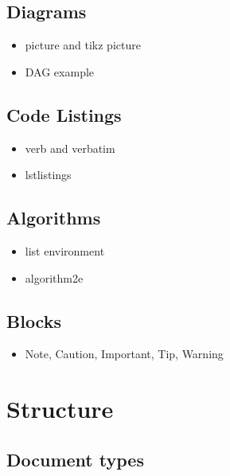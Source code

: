 \documentclass[
]{book}
\providecommand{\tightlist}{%
  \setlength{\itemsep}{0pt}\setlength{\parskip}{0pt}}
\begin{document}
\hypertarget{diagrams}{%
\section{Diagrams}\label{diagrams}}

\begin{itemize}
\tightlist
\item
  picture and tikz picture
\item
  DAG example
\end{itemize}

\hypertarget{code-listings}{%
\section{Code Listings}\label{code-listings}}

\begin{itemize}
\tightlist
\item
  verb and verbatim
\item
  lstlistings
\end{itemize}

\hypertarget{algorithms}{%
\section{Algorithms}\label{algorithms}}

\begin{itemize}
\tightlist
\item
  list environment
\item
  algorithm2e
\end{itemize}

\hypertarget{blocks}{%
\section{Blocks}\label{blocks}}

\begin{itemize}
\tightlist
\item
  Note, Caution, Important, Tip, Warning
\end{itemize}

\hypertarget{structure-1}{%
\chapter{Structure}\label{structure-1}}

\hypertarget{document-types}{%
\section{Document types}\label{document-types}}
\end{document}
